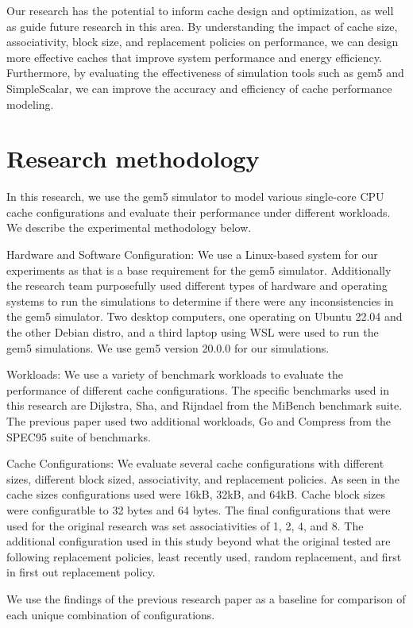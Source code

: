\documentclass[conference]{IEEEtran}
\begin{document}
Our research has the potential to inform cache design and optimization, as well as guide future research in this area. By understanding the impact of cache size, associativity, block size, and replacement policies on performance, we can design more effective caches that improve system performance and energy efficiency. Furthermore, by evaluating the effectiveness of simulation tools such as gem5 and SimpleScalar, we can improve the accuracy and efficiency of cache performance modeling.

\section{Research methodology}
In this research, we use the gem5 simulator to model various single-core CPU cache configurations and evaluate their performance under different workloads. We describe the experimental methodology below.

Hardware and Software Configuration:
We use a Linux-based system for our experiments as that is a base requirement for the gem5 simulator. Additionally the research team purposefully used different types of hardware and operating systems to run the simulations to determine if there were any inconsistencies in the gem5 simulator. Two desktop computers, one operating on Ubuntu 22.04 and the other Debian distro, and a third laptop using WSL were used to run the gem5 simulations. We use gem5 version 20.0.0 for our simulations.

Workloads:
We use a variety of benchmark workloads to evaluate the performance of different cache configurations. The specific benchmarks used in this research are Dijkstra, Sha, and Rijndael from the MiBench benchmark suite. The previous paper used two additional workloads, Go and Compress from the SPEC95 suite of benchmarks.

Cache Configurations:
We evaluate several cache configurations with different sizes, different block sized, associativity, and replacement policies. As seen in the cache sizes configurations used were 16kB, 32kB, and 64kB. Cache block sizes were configuratble to 32 bytes and 64 bytes. The final configurations that were used for the original research was set associativities of 1, 2, 4, and 8. The additional configuration used in this study beyond what the original tested are following replacement policies, least recently used, random replacement, and first in first out replacement policy.

We use the findings of the previous research paper as a baseline for comparison of each unique combination of configurations.
\end{document}
